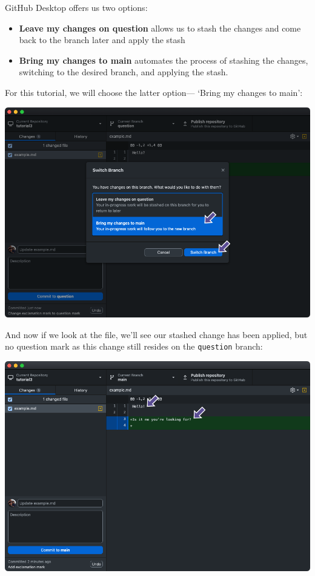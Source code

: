 \documentclass[
  letterpaper,
  DIV=11,
  numbers=noendperiod]{scrartcl}
\begin{document}
GitHub Desktop offers us two options:

\begin{itemize}
\item
  \textbf{Leave my changes on question} allows us to stash the changes
  and come back to the branch later and apply the stash
\item
  \textbf{Bring my changes to main} automates the process of stashing
  the changes, switching to the desired branch, and applying the stash.
\end{itemize}

For this tutorial, we will choose the latter option--- `Bring my changes
to main':

\includegraphics{images/image40.png}

And now if we look at the file, we'll see our stashed change has been
applied, but no question mark as this change still resides on the
\texttt{question} branch:

\includegraphics{images/image41.png}
\end{document}

